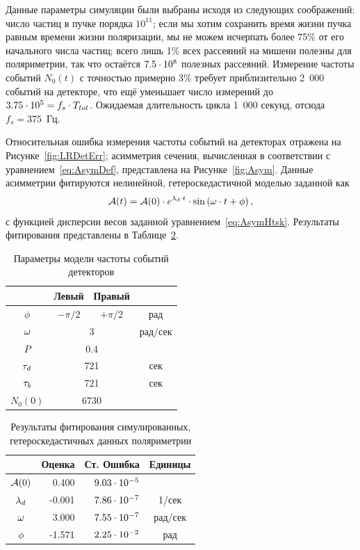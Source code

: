 Данные параметры симуляции были выбраны исходя из следующих
соображений: число частиц в пучке порядка $10^{11}$; если мы хотим
сохранить время жизни пучка равным времени жизни поляризации, мы не
можем исчерпать более 75\% от его начального числа частиц; всего лишь
1\% всех рассеяний на мишени полезны для поляриметрии, так что
остаётся ${7.5}\cdot 10^{8}$ полезных рассеяний. Измерение частоты событий
$N_0(t)$ с точностью примерно 3\% требует приблизительно 2~000 событий
на детекторе, что ещё уменьшает число измерений до ${{3.75}\cdot 10^{5}=f_s\cdot T_{tot}}$. 
Ожидаемая длительность цикла 1~000 секунд, отсюда $f_s = 375$~Гц. 

Относительная ошибка измерения частоты событий на детекторах отражена на
Рисунке~\ref{fig:LRDetErr}; асимметрия сечения, вычисленная в
соответствии с уравнением~\eqref{eq:AsymDef}, представлена на Рисунке~\ref{fig:Asym}.
Данные асимметрии фитируются нелинейной, гетероскедастичной моделью
заданной как
\[
\Asym(t) = \Asym(0)\cdot e^{\lamd\cdot t}\cdot\sin\bkt{\w\cdot t + \phi},
\]
с функцией дисперсии весов заданной
уравнением~\eqref{eq:AsymHtsk}. Результаты фитирования представлены в Таблице~\ref{tbl:FitRes}.
\begin{table}[H]
		\centering
		\caption{Параметры модели частоты событий детекторов\label{tbl:DetCntRtParam}}
		\begin{tabular}[t]{cccc}
			\toprule
			         & Левый    & Правый        &         \\ \midrule
			$\phi$   & $-\pi/2$ & $+\pi/2$      & рад     \\
			$\omega$     &  \multicolumn{2}{c}{3}   & рад/сек \\
			$P$      & \multicolumn{2}{c}{0.4}  &         \\
			$\tau_d$   & \multicolumn{2}{c}{721}  & сек     \\
			$\tau_b$   & \multicolumn{2}{c}{721}  & сек     \\
			$N_0(0)$ & \multicolumn{2}{c}{6730} &         \\ \bottomrule
		\end{tabular}
\end{table}

\begin{table}[H]
		\centering
		\caption{Результаты фитирования симулированных, гетероскедастичных данных поляриметрии\label{tbl:FitRes}}
		\begin{tabular}[t]{crrc}
			\toprule
			           & Оценка & Ст. Ошибка      & Единицы \\ \midrule
			$\mathcal{A}(0)$ & 0.400  & ${9.03}\cdot 10^{-5}$ &         \\
			$\lambda_d$    & -0.001 & ${7.86}\cdot 10^{-7}$ & 1/сек   \\
			$\omega$       & 3.000  & ${7.55}\cdot 10^{-7}$ & рад/сек \\
			$\phi$     & -1.571 & ${2.25}\cdot 10^{-2}$ & рад     \\ \bottomrule
		\end{tabular}
\end{table}

